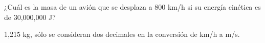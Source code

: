 ¿Cuál es la masa de un avión que se desplaza a 800 km/h si su energía
cinética es de 30,000,000 J?

\begin{solutionbox}{2cm}
    1,215 kg, sólo se consideran dos decimales en la conversión de km/h a m/s.
\end{solutionbox}

